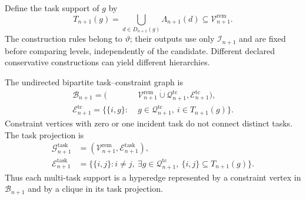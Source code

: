 Define the task support of $g$ by
\begin{equation}
T_{n+1}(g)=\bigcup_{d\in D_{n+1}(g)}\Lambda_{n+1}(d)
\subseteq\mathcal V_{n+1}^{\mathrm{rem}}.
\label{eq:constraint_task_support}
\end{equation}
The construction rules belong to $\vartheta$; their outputs use only
$\mathscr I_{n+1}$ and are fixed before comparing levels, independently of
the candidate. Different declared conservative constructions can yield
different hierarchies.

The undirected bipartite task--constraint graph is
\begin{equation}
\begin{split}
\mathcal B_{n+1}
=\bigl(&\mathcal V_{n+1}^{\mathrm{rem}}
\mathbin{\dot\cup}\mathcal Q_{n+1}^{\mathrm{tc}},
\mathcal E_{n+1}^{\mathrm{tc}}\bigr),\\
\mathcal E_{n+1}^{\mathrm{tc}}
=\{\{i,g\}:\;&g\in\mathcal Q_{n+1}^{\mathrm{tc}},\ i\in T_{n+1}(g)\}.
\end{split}
\label{eq:incidence_graph}
\end{equation}
Constraint vertices with zero or one incident task do not connect distinct
tasks. The task projection is
\begin{equation}
\begin{split}
\mathcal G_{n+1}^{\mathrm{task}}
&=(\mathcal V_{n+1}^{\mathrm{rem}},\mathcal E_{n+1}^{\mathrm{task}}),\\
\mathcal E_{n+1}^{\mathrm{task}}
&=\{\{i,j\}:i\ne j,\ \exists g\in\mathcal Q_{n+1}^{\mathrm{tc}},\
\{i,j\}\subseteq T_{n+1}(g)\}.
\end{split}
\label{eq:task_projection}
\end{equation}
Thus each multi-task support is a hyperedge represented by a constraint
vertex in $\mathcal B_{n+1}$ and by a clique in its task projection.

